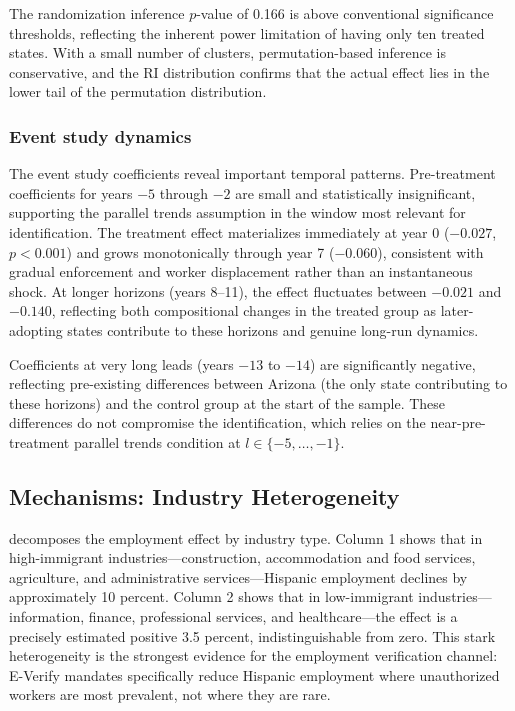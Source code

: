 \documentclass[12pt]{article}
\begin{document}
The randomization inference $p$-value of 0.166 is above conventional significance thresholds, reflecting the inherent power limitation of having only ten treated states. With a small number of clusters, permutation-based inference is conservative, and the RI distribution confirms that the actual effect lies in the lower tail of the permutation distribution.

\subsubsection*{Event study dynamics} The event study coefficients reveal important temporal patterns. Pre-treatment coefficients for years $-5$ through $-2$ are small and statistically insignificant, supporting the parallel trends assumption in the window most relevant for identification. The treatment effect materializes immediately at year 0 ($-0.027$, $p < 0.001$) and grows monotonically through year 7 ($-0.060$), consistent with gradual enforcement and worker displacement rather than an instantaneous shock. At longer horizons (years 8--11), the effect fluctuates between $-0.021$ and $-0.140$, reflecting both compositional changes in the treated group as later-adopting states contribute to these horizons and genuine long-run dynamics.

Coefficients at very long leads (years $-13$ to $-14$) are significantly negative, reflecting pre-existing differences between Arizona (the only state contributing to these horizons) and the control group at the start of the sample. These differences do not compromise the identification, which relies on the near-pre-treatment parallel trends condition at $l \in \{-5, \ldots, -1\}$.

\subsection{Mechanisms: Industry Heterogeneity}

 decomposes the employment effect by industry type. Column 1 shows that in high-immigrant industries---construction, accommodation and food services, agriculture, and administrative services---Hispanic employment declines by approximately 10 percent. Column 2 shows that in low-immigrant industries---information, finance, professional services, and healthcare---the effect is a precisely estimated positive 3.5 percent, indistinguishable from zero. This stark heterogeneity is the strongest evidence for the employment verification channel: E-Verify mandates specifically reduce Hispanic employment where unauthorized workers are most prevalent, not where they are rare.
\end{document}
